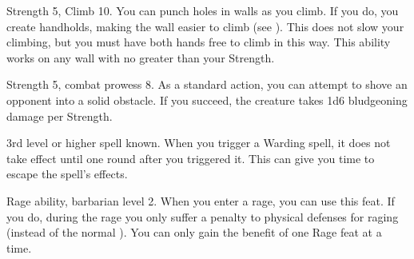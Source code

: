 \featpres Strength 5, Climb 10.
\featben You can punch holes in walls as you climb.
If you do, you create handholds, making the wall easier to climb (see ).
This does not slow your climbing, but you must have both hands free to climb in this way.
This ability works on any wall with  no greater than your Strength.

\featpres Strength 5, combat prowess 8.
\featben As a standard action, you can attempt to shove an opponent into a solid obstacle.
If you succeed, the creature takes 1d6 bludgeoning damage per Strength.

\featpre 3rd level or higher  spell known.
\featben When you trigger a Warding spell, it does not take effect until one round after you triggered it. This can give you time to escape the spell's effects.

\featpres Rage ability, barbarian level 2.
\featben When you enter a rage, you can use this feat. If you do, during the rage you only suffer a  penalty to physical defenses for raging (instead of the normal ).
 You can only gain the benefit of one Rage feat at a time.

